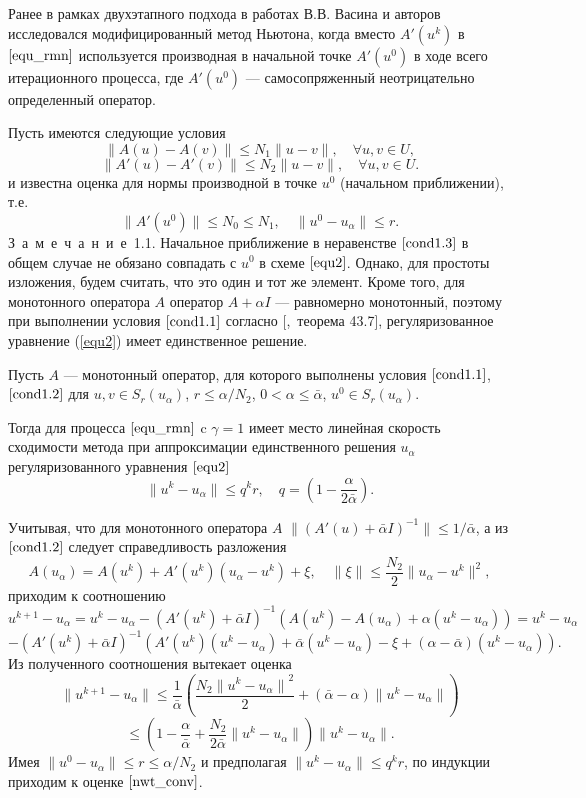 Ранее в рамках двухэтапного подхода в работах В.В. Васина и авторов \cite{VasAkiMin2013, Vasin2014} исследовался модифицированный метод Ньютона, когда вместо $A'(u^k)$ в $\eqref{equ_rmn}$ используется производная в начальной точке $A'(u^0)$ в ходе всего итерационного процесса, где $A'(u^0)$ --- самосопряженный неотрицательно определенный оператор.  

Пусть имеются следующие условия
\begin{equation}\label{cond1.1}
\|A(u)-A(v)\|\le N_1\|u-v\|, \quad \forall u, v \in U,
\end{equation}
\begin{equation}\label{cond1.2}
\|A'(u)-A'(v)\|\le N_2\|u-v\|, \quad \forall u, v \in U.
\end{equation}
и известна оценка для нормы производной в точке $u^0$ (начальном приближении), т.е.
\begin{equation}\label{cond1.3}
\|A'(u^0)\| \le N_0\le N_1, \quad \|u^0-u_\alpha\| \le r.
\end{equation}
\mbox{З\ а\ м\ е\ ч\ а\ н\ и\ е 1.1.} Начальное приближение в неравенстве $\eqref{cond1.3}$ в общем случае не обязано совпадать с $u^0$ в схеме $\eqref{equ2}$. Однако, для простоты изложения, будем считать, что это один и тот же элемент. Кроме того, для монотонного оператора $A$ оператор $A+\alpha I$ --- равномерно монотонный, поэтому при выполнении условия $\ref{cond1.1}$ согласно [\cite{KufFuch1988},~теорема 43.7], регуляризованное уравнение (\ref{equ2}) имеет единственное решение.

\begin{theorem}\label{teo2.1} Пусть $A$ --- монотонный оператор, для которого выполнены условия $\eqref{cond1.1}$, $\eqref{cond1.2}$ для $u, v \in S_r(u_\alpha)$, $r\le \alpha/N_2$, $0<\alpha \le \bar\alpha$, $u^0 \in S_r(u_\alpha)$. 
	
	Тогда для процесса $\eqref{equ_rmn}$ c $\gamma=1$ имеет место линейная скорость сходимости метода при аппроксимации единственного решения $u_\alpha$ регуляризованного уравнения $\eqref{equ2}$
	\begin{equation}\label{nwt_conv}
	\| u^k-u_\alpha \| \le q^kr, \quad q=(1-\frac{\alpha}{2\bar\alpha}).
	\end{equation}
\end{theorem}
\proof 
Учитывая, что для монотонного оператора $A$ $\| (A'(u)+\bar\alpha I)^{-1} \| \le 1/\bar\alpha$, а из $\eqref{cond1.2}$ следует справедливость разложения
$$
A(u_\alpha)=A(u^k)+A'(u^k)(u_\alpha-u^k)+\xi, \quad \|\xi\|\le \frac{N_2}{2}\|u_\alpha-u^k\|^2,
$$
приходим к соотношению 
$$
u^{k+1}-u_\alpha=u^k-u_\alpha-(A'(u^k)+\bar\alpha I)^{-1}(A(u^k)-A(u_\alpha)+\alpha(u^k-u_\alpha))=u^k- u_\alpha$$ $$-(A'(u^k)+\bar\alpha I)^{-1}(A'(u^k)(u^k-u_\alpha)+\bar\alpha(u^k-u_\alpha)-\xi+(\alpha-\bar\alpha)(u^k-u_\alpha)). $$
Из полученного соотношения вытекает оценка
$$
\|u^{k+1}-u_\alpha\|\le\frac{1}{\bar\alpha}\left(\frac{N_2{\|u^{k}-u_\alpha\|}^2}{2}+(\bar\alpha-\alpha)\|u^k-u_\alpha\|\right)$$
$$\le\left(1-\frac{\alpha}{\bar\alpha}+\frac{N_2}{2\bar\alpha}\|u^k-u_\alpha\|\right)\|u^k-u_\alpha\|.$$
Имея $\|u^0-u_\alpha\|\le r \le \alpha/N_2$ и предполагая $\| u^{k}-u_\alpha \|\le q^kr$, по индукции приходим к оценке $\eqref{nwt_conv}$.

